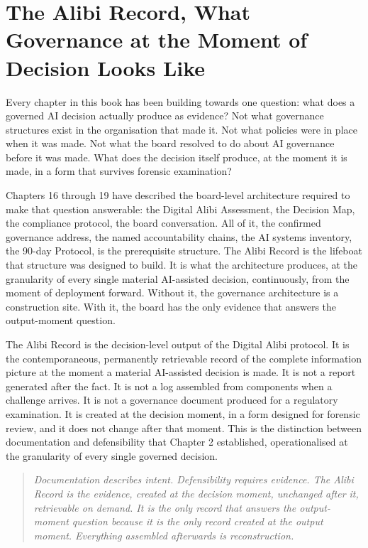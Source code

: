 
\chapter{The Alibi Record, What Governance at the Moment of Decision Looks Like}

Every chapter in this book has been building towards one question: what does a governed AI decision actually produce as evidence? Not what governance structures exist in the organisation that made it. Not what policies were in place when it was made. Not what the board resolved to do about AI governance before it was made. What does the decision itself produce, at the moment it is made, in a form that survives forensic examination?

Chapters 16 through 19 have described the board-level architecture required to make that question answerable: the Digital Alibi Assessment, the Decision Map, the compliance protocol, the board conversation. All of it, the confirmed governance address, the named accountability chains, the AI systems inventory, the 90-day Protocol, is the prerequisite structure. The Alibi Record is the lifeboat that structure was designed to build. It is what the architecture produces, at the granularity of every single material AI-assisted decision, continuously, from the moment of deployment forward. Without it, the governance architecture is a construction site. With it, the board has the only evidence that answers the output-moment question.

The Alibi Record is the decision-level output of the Digital Alibi protocol. It is the contemporaneous, permanently retrievable record of the complete information picture at the moment a material AI-assisted decision is made. It is not a report generated after the fact. It is not a log assembled from components when a challenge arrives. It is not a governance document produced for a regulatory examination. It is created at the decision moment, in a form designed for forensic review, and it does not change after that moment. This is the distinction between documentation and defensibility that Chapter 2 established, operationalised at the granularity of every single governed decision.

\begin{quote}
\emph{Documentation describes intent. Defensibility requires evidence. The Alibi Record is the evidence, created at the decision moment, unchanged after it, retrievable on demand. It is the only record that answers the output-moment question because it is the only record created at the output moment. Everything assembled afterwards is reconstruction.}
\end{quote}


